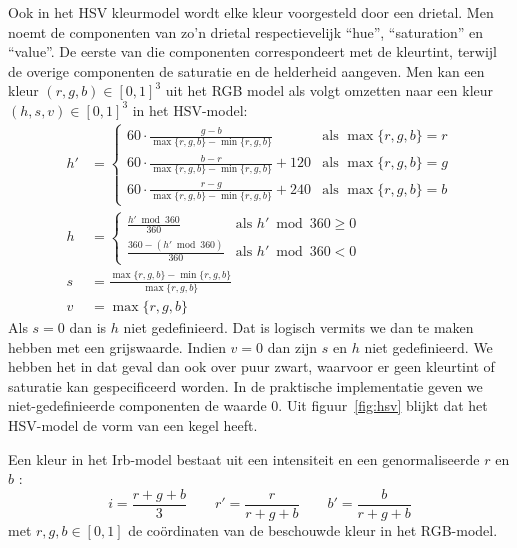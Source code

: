 Ook in het HSV kleurmodel \cite{tkalcic:colour_spaces} wordt elke kleur voorgesteld 
door een drietal. Men noemt de componenten van zo'n drietal respectievelijk 
``hue'', ``saturation'' en ``value''. De eerste van die componenten 
correspondeert met de kleurtint, terwijl de overige componenten de saturatie
en de helderheid aangeven. Men kan een kleur $(r,g,b) \in [0,1]^3$ uit het RGB 
model als volgt omzetten naar een kleur $(h,s,v) \in [0,1]^3$ in het HSV-model: 
\begin{align*}
h' & = \begin{cases}
60 \cdot \frac{g - b}{\max \{r,g,b\} - \min \{r,g,b\}} & \textrm{als } \max \{r,g,b\} = r \\[2pt]
60 \cdot \frac{b - r}{\max \{r,g,b\} - \min \{r,g,b\}} + 120 & \textrm{als } \max \{r,g,b\} = g \\[2pt]
60 \cdot \frac{r - g}{\max \{r,g,b\} - \min \{r,g,b\}} + 240 & \textrm{als } \max \{r,g,b\} = b
\end{cases} \\[2pt]
h & = \begin{cases}
\frac{h' \bmod 360}{360} & \textrm{als } h' \bmod 360 \geq 0 \\[2pt] 
\frac{360 - (h' \bmod 360)}{360} & \textrm{als } h' \bmod 360 < 0 
\end{cases} \\[2pt]
s & = \frac{\max \{r,g,b\} - \min \{r,g,b\}}{\max \{r,g,b\}} \\ %
v & = \max \{r,g,b\}
\end{align*}
Als $s=0$ dan is $h$ niet gedefinieerd. Dat is logisch vermits we dan te 
maken hebben met een grijswaarde. Indien $v=0$ dan zijn $s$ en $h$ niet gedefinieerd. We 
hebben het in dat geval dan ook over puur zwart, waarvoor er geen kleurtint of 
saturatie kan gespecificeerd worden. In de praktische implementatie geven we 
niet-gedefinieerde componenten de waarde $0$. Uit figuur~\ref{fig:hsv} blijkt dat
het HSV-model de vorm van een kegel heeft.

Een kleur in het Irb-model bestaat uit een intensiteit en een genormaliseerde $r$ en $b$ 
\cite{ohta:color_info_for_region_segm}:
\begin{displaymath}
 i = \frac{r+g+b}{3} \qquad r' = 
\frac{r}{r+g+b} \qquad b' = \frac{b}{r+g+b}
\end{displaymath}
met $r,g,b \in [0,1]$ de co\"ordinaten van de beschouwde kleur in het RGB-model. 

